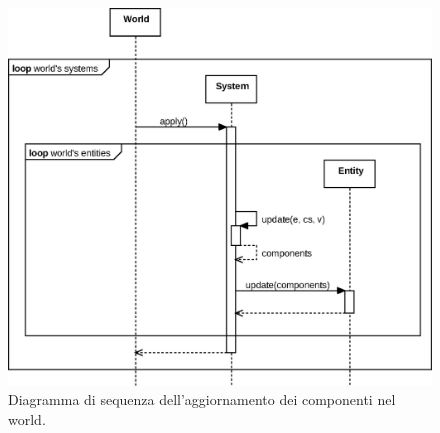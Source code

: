 \begin{figure}[H]
    \centering
    \includegraphics[width=\textwidth]{./img/Sequence}
    \caption{Diagramma di sequenza dell'aggiornamento dei componenti nel world.}\label{fig:figure}
\end{figure}


